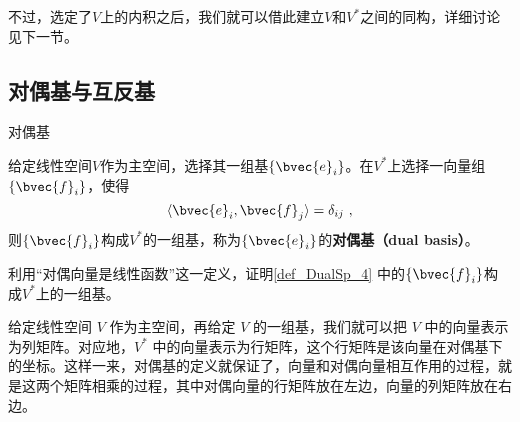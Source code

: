 不过，选定了$V$上的内积之后，我们就可以借此建立$V$和$V^*$之间的同构，详细讨论见下一节。

















\subsection{对偶基与互反基}

\begin{definition}{对偶基}\label{def_DualSp_4}

给定线性空间$V$作为主空间，选择其一组基$\{\bvec{e}_i\}$。在$V^*$上选择一向量组$\{\bvec{f}_i\}$，使得
\begin{equation}
\langle \bvec{e}_i, \bvec{f}_j \rangle = \delta_{ij}~, 
\end{equation}
则$\{\bvec{f}_i\}$构成$V^*$的一组基，称为$\{\bvec{e}_i\}$的\textbf{对偶基（dual basis）}。

\end{definition}


\begin{exercise}{}
利用“对偶向量是线性函数”这一定义，证明\autoref{def_DualSp_4} 中的$\{\bvec{f}_i\}$构成$V^*$上的一组基。
\end{exercise}



给定线性空间 $V$ 作为主空间，再给定 $V$ 的一组基，我们就可以把 $V$ 中的向量表示为列矩阵。对应地，$V^*$ 中的向量表示为行矩阵，这个行矩阵是该向量在对偶基下的坐标。这样一来，对偶基的定义就保证了，向量和对偶向量相互作用的过程，就是这两个矩阵相乘的过程，其中对偶向量的行矩阵放在左边，向量的列矩阵放在右边。


